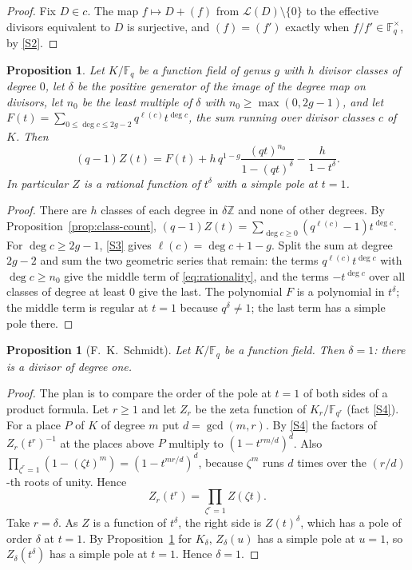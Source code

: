 \documentclass[11pt]{amsbook}
\theoremstyle{plain}
\newtheorem{proposition}[theorem]{Proposition}
\theoremstyle{definition}
\theoremstyle{remark}
\numberwithin{equation}{section}
\numberwithin{figure}{chapter}
\numberwithin{table}{chapter}
\newcommand{\Z}{\mathbb{Z}}
\newcommand{\F}{\mathbb{F}}
\newcommand{\calL}{\mathcal{L}}
\begin{document}
\begin{proof}
Fix $D\in c$. The map $f\mapsto D+(f)$ from
$\calL(D)\setminus\{0\}$ to the effective divisors equivalent to $D$
is surjective, and $(f)=(f')$ exactly when $f/f'\in\F_q^\times$, by
\ref{S2}.
\end{proof}

\begin{proposition}\label{prop:rationality-delta}\label{def:n0-F}
Let $K/\F_q$ be a function field of genus $g$ with $h$ divisor
classes of degree $0$, let $\delta$ be the positive generator of the
image of the degree map on divisors, let $n_0$ be the least multiple
of $\delta$ with $n_0\ge\max(0,2g-1)$, and let
$F(t)=\sum_{0\le\deg c\le2g-2}q^{\ell(c)}t^{\deg c}$, the sum
running over divisor classes $c$ of $K$. Then
\begin{equation}\label{eq:rationality}
(q-1)Z(t)=F(t)+h\,q^{1-g}\frac{(qt)^{n_0}}{1-(qt)^\delta}
-\frac{h}{1-t^\delta}.
\end{equation}
In particular $Z$ is a rational function of $t^\delta$ with a simple
pole at $t=1$.
\end{proposition}

\begin{proof}
There are $h$ classes of each degree in $\delta\Z$ and none of other
degrees. By Proposition~\ref{prop:class-count},
$(q-1)Z(t)=\sum_{\deg c\ge0}(q^{\ell(c)}-1)t^{\deg c}$. For
$\deg c\ge2g-1$, \ref{S3} gives $\ell(c)=\deg c+1-g$. Split the sum
at degree $2g-2$ and sum the two geometric series that remain: the
terms $q^{\ell(c)}t^{\deg c}$ with $\deg c\ge n_0$ give the middle
term of \eqref{eq:rationality}, and the terms $-t^{\deg c}$ over all
classes of degree at least $0$ give the last. The polynomial $F$ is
a polynomial in $t^\delta$; the middle term is regular at $t=1$
because $q^\delta\ne1$; the last term has a simple pole there.
\end{proof}

\begin{proposition}[F.~K.~Schmidt]\label{prop:delta-one}
Let $K/\F_q$ be a function field. Then $\delta=1$: there is a
divisor of degree one.
\end{proposition}

\begin{proof}
The plan is to compare the order of the pole at $t=1$ of both sides
of a product formula. Let $r\ge1$ and let $Z_r$ be the zeta function
of $K_r/\F_{q^r}$ (fact \ref{S4}). For a place $P$ of $K$ of degree
$m$ put $d=\gcd(m,r)$. By \ref{S4} the factors of
$Z_r(t^r)^{-1}$ at the places above $P$ multiply to
$(1-t^{rm/d})^d$. Also
$\prod_{\zeta^r=1}(1-(\zeta t)^m)=(1-t^{mr/d})^d$, because
$\zeta^m$ runs $d$ times over the $(r/d)$-th roots of unity. Hence
\begin{equation}\label{eq:zeta-tower}
Z_r(t^r)=\prod_{\zeta^r=1}Z(\zeta t).
\end{equation}
Take $r=\delta$. As $Z$ is a function of $t^\delta$, the right side
is $Z(t)^\delta$, which has a pole of order $\delta$ at $t=1$. By
Proposition~\ref{prop:rationality-delta} for $K_\delta$,
$Z_\delta(u)$ has a simple pole at $u=1$, so $Z_\delta(t^\delta)$
has a simple pole at $t=1$. Hence $\delta=1$.
\end{proof}
\end{document}
